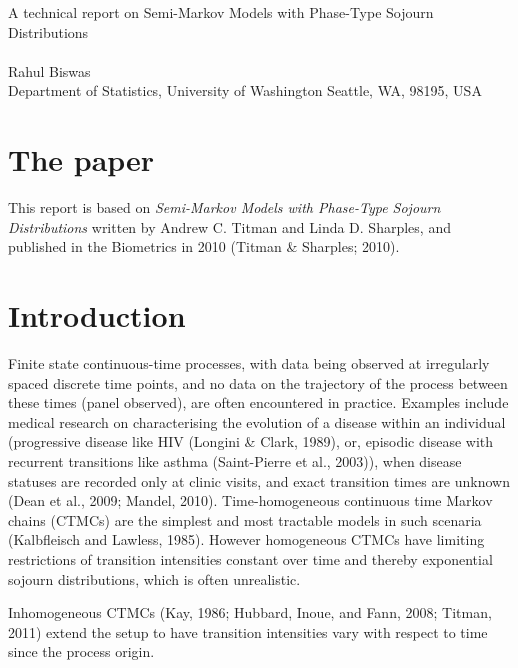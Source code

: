 \documentclass{uwstat572}
\begin{document}

\begin{center}
  {\LARGE A technical report on Semi-Markov Models with Phase-Type Sojourn Distributions}\\\ \\
  {Rahul Biswas \\ 
    Department of Statistics, University of Washington Seattle, WA, 98195, USA
  }
\end{center}
\nocite{*}
\section*{The paper}
This report is based on \textit{Semi-Markov Models with Phase-Type Sojourn Distributions} written by Andrew C. Titman and Linda D. Sharples, and published in the Biometrics in 2010 (Titman \& Sharples; 2010).

\section{Introduction}

Finite state continuous-time processes, with data being observed at irregularly spaced discrete time points, and no data on the trajectory of the process between these times (panel observed), are often encountered in practice. Examples include medical research on characterising the evolution of a disease within an individual (progressive disease like HIV (Longini \& Clark, 1989), or, episodic disease with recurrent transitions like asthma (Saint-Pierre et al., 2003)), when disease statuses are recorded only at clinic visits, and exact transition times are unknown (Dean et al., 2009; Mandel, 2010).
Time-homogeneous continuous time Markov chains (CTMCs) are the simplest and most tractable models in such scenaria (Kalbfleisch and Lawless, 1985). However homogeneous CTMCs have limiting restrictions of transition intensities constant over time and thereby exponential sojourn distributions, which is often unrealistic.

Inhomogeneous CTMCs (Kay, 1986; Hubbard, Inoue, and Fann, 2008; Titman, 2011) extend the setup to have transition intensities vary with respect to time since the process origin. 
\end{document}
